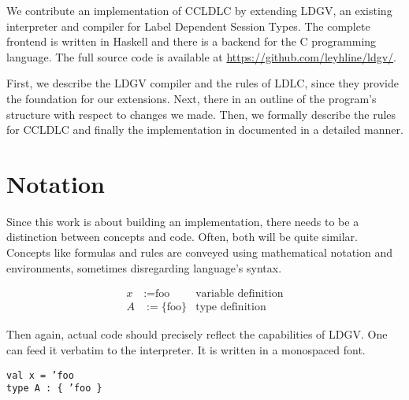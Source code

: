 We contribute an implementation of CCLDLC by extending LDGV, an existing interpreter and compiler for Label Dependent Session Types. The complete frontend is written in Haskell and there is a backend for the C programming language. The full source code is available at \url{https://github.com/leyhline/ldgv/}. 

First, we describe the LDGV compiler and the rules of LDLC, since they provide the foundation for our extensions. Next, there in an outline of the program's structure with respect to changes we made. Then, we formally describe the rules for CCLDLC and finally the implementation in documented in a detailed manner.

\section{Notation}

Since this work is about building an implementation, there needs to be a distinction between concepts and code. Often, both will be quite similar. Concepts like formulas and rules are conveyed using mathematical notation and environments, sometimes disregarding language's syntax.

\begin{align*}
 x &:= \text{foo} & \text{variable definition} \\
 A &:= \{ \text{foo} \} & \text{type definition}
\end{align*}

Then again, actual code should precisely reflect the capabilities of LDGV. One can feed it verbatim to the interpreter. It is written in a monospaced font.

\centering
\texttt{val x = 'foo \\ type A : \{ 'foo \}}
